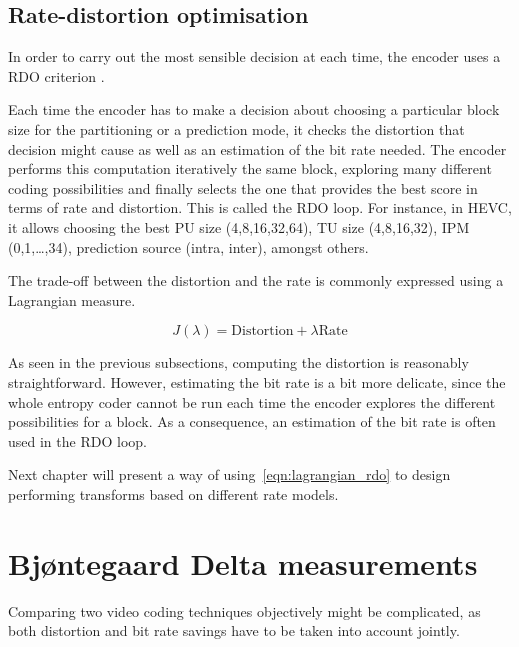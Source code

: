 \documentclass[11pt,a4paper,openright,twoside]{book}
\numberwithin{equation}{section} %
\numberwithin{figure}{section} %
\numberwithin{table}{section} %
\begin{document}
\subsection{Rate-distortion optimisation}
\label{sub:rate_distortion_optimisation}

In order to carry out the most sensible decision at each time, the
encoder uses a \ac{RDO} criterion
\cite{sullivan-98-rdo-video-compression}.

Each time the encoder has to make a decision about choosing a
particular block size for the partitioning or a prediction mode, it
checks the distortion that decision might cause as well as an estimation
of the bit rate needed.
The encoder performs this computation iteratively the same block,
exploring many different coding possibilities and finally selects the
one that provides the best score in terms of rate and distortion.
This is called the \ac{RDO} loop.
For instance, in \ac{HEVC}, it allows choosing the best \ac{PU} size
(4,8,16,32,64), \ac{TU} size (4,8,16,32), \ac{IPM} (0,1,\ldots,34), prediction
source (intra, inter), amongst others.

The trade-off between the distortion and the rate is commonly expressed
using a Lagrangian measure.

\begin{equation}
	J(\lambda) = \text{Distortion} + \lambda \text{Rate}
	\label{eqn:lagrangian_rdo}
\end{equation}

As seen in the previous subsections, computing the distortion is
reasonably straightforward.
However, estimating the bit rate is a bit more delicate, since the whole
entropy coder cannot be run each time the encoder explores the different
possibilities for a block.
As a consequence, an estimation of the bit rate is often used in the \ac{RDO}
loop.

Next chapter will present a way of using~\eqref{eqn:lagrangian_rdo} to design
performing transforms based on different rate models.

\section{Bj{\o}ntegaard Delta measurements}
\label{sub:bjontegaard_delta_measurements}

Comparing two video coding techniques objectively might be complicated,
as both distortion and bit rate savings have to be taken into account jointly.
\end{document}
